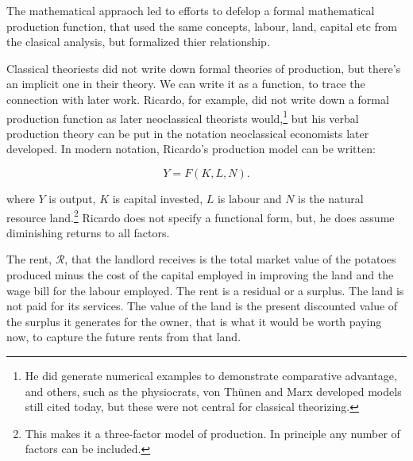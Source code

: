 The mathematical appraoch led to efforts to defelop a formal mathematical production function, that used the same concepts, labour, land, capital etc from the clasical analysis, but formalized thier relationship. 


Classical theoriests did not write down formal theories of production, but there's an implicit one in their theory. We can write it as a function, to trace the connection with later work. Ricardo, for example, did not write down a formal production function as later \gls{neoclassical} theorists would,\footnote{He did generate numerical examples to demonstrate comparative advantage, and others, such as the physiocrats, von Th\"unen and Marx developed models still cited today, but these were not central for classical theorizing.} but his verbal production theory can be put in the notation neoclassical economists later developed. In modern notation, Ricardo's production model can be written: 

\begin{equation} 
Y=F(K,L,N).
\label{eqn-production-ricardo}
\end{equation} 

where  $Y$ is output, $K$ is capital invested, $L$ is labour and $N$  is the natural resource land.\footnote{This makes it a three-factor model of production.  In principle any number of factors can be included.}  
Ricardo does not specify a functional form, but, %
he does assume diminishing returns to all factors. 

The  rent, $\mathcal{R}$, that the landlord receives is the total market value of the potatoes produced minus the cost of the capital employed in improving the land and the wage bill for the labour employed. %
The rent is a residual or a \gls{surplus}. The land is not paid for its services. The value of the land is the \gls{present discounted value} of the surplus it generates for the owner, that is what it would be worth paying now, to capture the future rents from that land.

